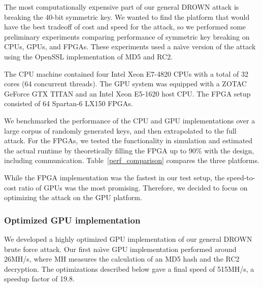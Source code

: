 
The most computationally expensive part of our general DROWN attack is breaking the 40-bit symmetric key.  We wanted to find the platform that would have the best tradeoff of cost and speed for the attack, so we performed some preliminary experiments comparing performance of symmetric key breaking on CPUs, GPUs, and FPGAs.  These experiments used a na\"{\i}ve version of the attack using the OpenSSL implementation of MD5 and RC2.

The CPU machine contained four Intel Xeon E7-4820 CPUs with a total of 32 cores (64 concurrent threads). The GPU system was equipped with a ZOTAC GeForce GTX TITAN and an Intel Xeon E5-1620 host CPU\@. The FPGA setup consisted of 64 Spartan-6 LX150 FPGAs.

We benchmarked the performance of the CPU and GPU implementations over a large corpus of randomly generated keys, and then extrapolated to the full attack.
For the FPGAs, we tested the functionality in simulation and estimated the actual runtime by theoretically filling the FPGA up to 90\% with the design, including communication.
Table~\ref{perf_comparison} compares the three platforms.

While the FPGA implementation was the fastest in our test setup, the speed-to-cost ratio of GPUs was the most promising. Therefore, we decided to focus on optimizing the attack on the GPU platform.
\fi

\ifext
\subsubsection{Optimized GPU implementation}
\label{sec:gpu_brief}
We developed a highly optimized GPU implementation of our general DROWN brute force attack.  Our first na\"{\i}ve GPU implementation performed around 26MH/s, where MH measures the calculation of an MD5 hash and the RC2 decryption. The optimizations described below gave a final speed of 515MH/s, a speedup factor of 19.8.
\fi

